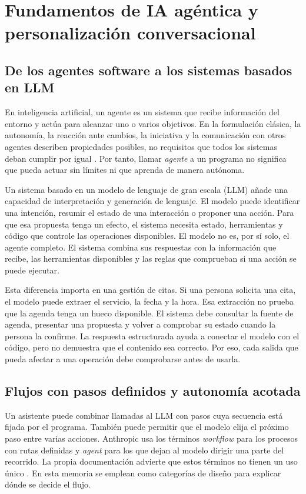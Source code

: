 \chapter{Fundamentos de IA agéntica y personalización conversacional}
\label{chap:fundamentos}

\section{De los agentes software a los sistemas basados en LLM}

En inteligencia artificial, un agente es un sistema que recibe información
del entorno y actúa para alcanzar uno o varios objetivos. En la formulación
clásica, la autonomía, la reacción ante cambios, la iniciativa y la
comunicación con otros agentes describen propiedades posibles, no requisitos
que todos los sistemas deban cumplir por igual \citep{wooldridge1995agents}.
Por tanto, llamar \emph{agente} a un programa no significa que pueda actuar
sin límites ni que aprenda de manera autónoma.

Un sistema basado en un modelo de lenguaje de gran escala (LLM) añade una
capacidad de interpretación y generación de lenguaje. El modelo puede
identificar una intención, resumir el estado de una interacción o proponer una
acción. Para que esa propuesta tenga un efecto, el sistema necesita estado,
herramientas y código que controle las operaciones disponibles. El modelo no
es, por sí solo, el agente completo. El sistema combina sus respuestas con la
información que recibe, las herramientas disponibles y las reglas que
comprueban si una acción se puede ejecutar.

Esta diferencia importa en una gestión de citas. Si una persona solicita una
cita, el modelo puede extraer el servicio, la fecha y la hora. Esa extracción
no prueba que la agenda tenga un hueco disponible. El sistema debe consultar
la fuente de agenda, presentar una propuesta y volver a comprobar su estado
cuando la persona la confirme. La respuesta estructurada ayuda a conectar el
modelo con el código, pero no demuestra que el contenido sea correcto. Por
eso, cada salida que pueda afectar a una operación debe comprobarse antes de
usarla.

\section{Flujos con pasos definidos y autonomía acotada}

Un asistente puede combinar llamadas al LLM con pasos cuya secuencia está
fijada por el programa. También puede permitir que el modelo elija el próximo
paso entre varias acciones. Anthropic usa los términos \emph{workflow} para
los procesos con rutas definidas y \emph{agent} para los que dejan al modelo
dirigir una parte del recorrido. La propia documentación advierte que estos
términos no tienen un uso único \citep{anthropicEffectiveAgents}. En esta
memoria se emplean como categorías de diseño para explicar dónde se decide el
flujo.

